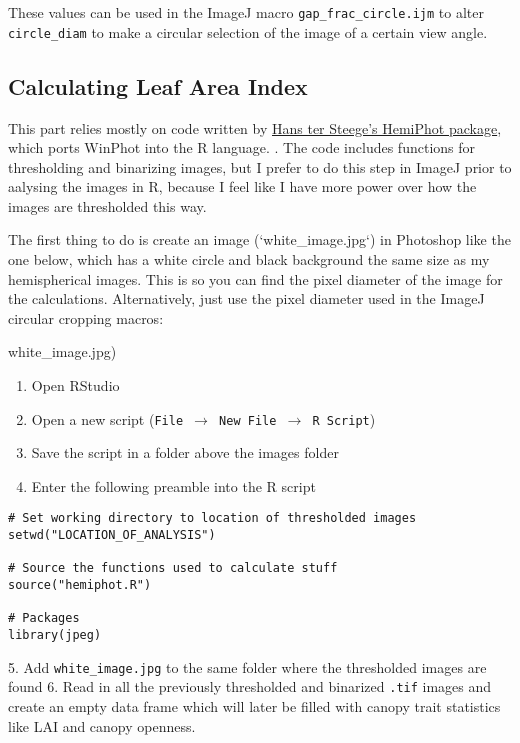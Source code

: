 \documentclass{article}
\begin{document}
These values can be used in the ImageJ macro \texttt{gap\_frac\_circle.ijm} to alter \texttt{circle\_diam} to make a circular selection of the image of a certain view angle.

\subsection{Calculating Leaf Area Index}

This part relies mostly on code written by \href{https://github.com/naturalis/Hemiphot}{Hans ter Steege's HemiPhot package}, which ports WinPhot into the R language. . The code includes functions for thresholding and binarizing images, but I prefer to do this step in ImageJ prior to aalysing the images in R, because I feel like I have more power over how the images are thresholded this way.

The first thing to do is create an image (`white\_image.jpg`) in Photoshop like the one below, which has a white circle and black background the same size as my hemispherical images. This is so you can find the pixel diameter of the image for the calculations. Alternatively, just use the pixel diameter used in the ImageJ circular cropping macros:

white\_image.jpg)

\begin{enumerate}
	\item{Open RStudio}
	\item{Open a new script (\texttt{File $\rightarrow$ New File $\rightarrow$ R Script})}
	\item{Save the script in a folder above the images folder}
	\item{Enter the following preamble into the R script}
\end{enumerate}

\begin{lstlisting}
# Set working directory to location of thresholded images
setwd("LOCATION_OF_ANALYSIS")

# Source the functions used to calculate stuff
source("hemiphot.R")

# Packages
library(jpeg)
\end{lstlisting}

5. Add \texttt{white\_image.jpg} to the same folder where the thresholded images are found
6. Read in all the previously thresholded and binarized \texttt{.tif} images and create an empty data frame which will later be filled with canopy trait statistics like LAI and canopy openness.
\end{document}
